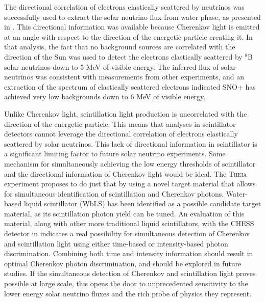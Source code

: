 The directional correlation of electrons elastically scattered by neutrinos was successfully used to extract the solar neutrino flux from {\snop} water phase, as presented in .
This directional information was available because Cherenkov light is emitted at an angle with respect to the direction of the energetic particle creating it.
In that analysis, the fact that no background sources are correlated with the direction of the Sun was used to detect the electrons elastically scattered by $^8$B solar neutrinos down to $5$ MeV of visible energy.
The inferred flux of solar neutrinos was consistent with measurements from other experiments, and an extraction of the spectrum of elastically scattered electrons indicated SNO+ has achieved very low backgrounds down to $6$ MeV of visible energy.

Unlike Cherenkov light, scintillation light production is uncorrelated with the direction of the energetic particle.
This means that analyses in scintillator detectors cannot leverage the directional correlation of electrons elastically scattered by solar neutrinos.
This lack of directional information in scintillator is a significant limiting factor to future solar neutrino experiments.
Some mechanism for simultaneously achieving the low energy thresholds of scintillator and the directional information of Cherenkov light would be ideal.
The \textsc{Theia} experiment proposes to do just that by using a novel target material that allows for simultaneous identification of scintillation and Cherenkov photons.
Water-based liquid scintillator (WbLS) has been identified as a possible candidate target material, as its scintillation photon yield can be tuned.
An evaluation of this material, along with other more traditional liquid scintillators, with the CHESS detector in  indicates a real possibility for simultaneous detection of Cherenkov and scintillation light using either time-based or intensity-based photon discrimination.
Combining both time and intensity information should result in optimal Cherenkov photon discrimination, and should be explored in future studies.
If the simultaneous detection of Cherenkov and scintillation light proves possible at large scale, this opens the door to unprecedented sensitivity to the lower energy solar neutrino fluxes and the rich probe of physics they represent.
